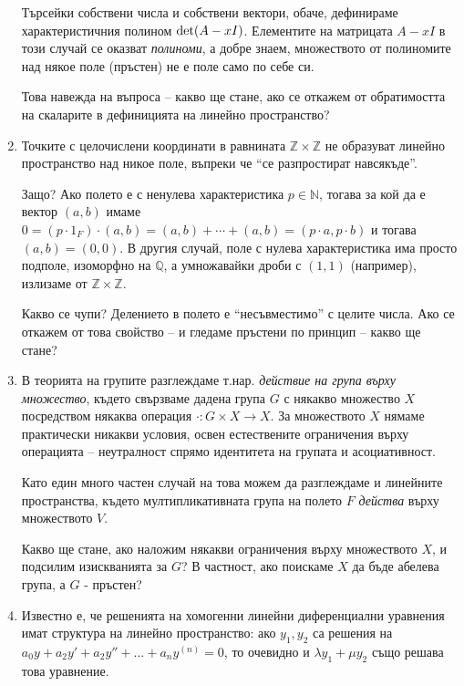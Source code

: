 \documentclass{article}
\newif\ifusemulticols
\theoremstyle{definition}
\theoremstyle{remark}
\theoremstyle{plain}
\theoremstyle{plain}
\newenvironment{mymulticols}
    { \ifusemulticols \begin{multicols}{2} \fi }
    { \ifusemulticols \end{multicols} \fi }
\newcommand{\N}{\mathbb{N}}
\newcommand{\Z}{\mathbb{Z}}
\begin{document}
\begin{mymulticols}
\begin{enumerate}
        Търсейки собствени числа и собствени вектори, обаче, дефинираме характеристичния полином
        $\textnormal{det}(A - xI)$. Елементите на матрицата $A-xI$ в този случай се оказват
        \textit{полиноми}, а добре знаем, множеството от полиномите над някое поле (пръстен) не е
        поле само по себе си.

        Това навежда на въпроса -- какво ще стане, ако се откажем от обратимостта на скаларите в
        дефиницията на линейно пространство?

    \item Точките с целочислени координати в равнината $\Z \times \Z$ не образуват
        линейно пространство над никое поле, въпреки че ``се разпростират навсякъде''.

        Защо? Ако полето е с ненулева характеристика $p \in \N$, тогава за кой да е вектор $(a, b)$
        имаме $0 = (p \cdot 1_F) \cdot (a, b) = (a, b) + \cdots + (a, b) = (p \cdot a, p \cdot b)$ и
        тогава $(a, b) = (0, 0)$.  В другия случай, поле с нулева характеристика има просто подполе,
        изоморфно на $\mathbb Q$, а умножавайки дроби с $(1,1)$ (например), излизаме от $\Z
        \times \Z$.

        Какво се чупи? Делението в полето е ``несъвместимо'' с целите числа.
        Ако се откажем от това свойство -- и гледаме пръстени по принцип -- какво ще стане?

    \item В теорията на групите разглеждаме т.нар. \textit{действие на група върху множество},
        където свързваме дадена група $G$ с някакво множество $X$ посредством някаква операция
        $\cdot : G \times X \to X$. За множеството $X$ нямаме практически никакви условия, освен
        естествените ограничения върху операцията -- неутралност спрямо идентитета на групата и асоциативност.

        Като един много частен случай на това можем да разглеждаме и линейните пространства, където
        мултипликативната група на полето $F$ \textit{действа} върху множеството $V$.

        Какво ще стане, ако наложим някакви ограничения върху множеството $X$, и подсилим
        изискванията за $G$? В частност, ако поискаме $X$ да бъде абелева група, а $G$ - пръстен?

    \item Известно е, че решенията на хомогенни линейни диференциални уравнения имат структура на
        линейно пространство: ако $y_1, y_2$ са решения на $a_0y+a_2y' + a_2y'' + \ldots + a_n
        y^{(n)} = 0$, то очевидно и $\lambda y_1 + \mu y_2$ също решава това уравнение.


\end{enumerate}
\end{mymulticols}
\end{document}

